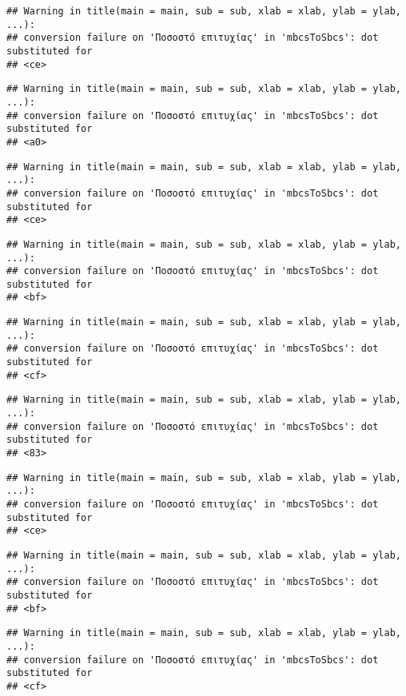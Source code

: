 \documentclass[
]{article}
\begin{document}
\begin{verbatim}
## Warning in title(main = main, sub = sub, xlab = xlab, ylab = ylab, ...):
## conversion failure on 'Ποσοστό επιτυχίας' in 'mbcsToSbcs': dot substituted for
## <ce>
\end{verbatim}

\begin{verbatim}
## Warning in title(main = main, sub = sub, xlab = xlab, ylab = ylab, ...):
## conversion failure on 'Ποσοστό επιτυχίας' in 'mbcsToSbcs': dot substituted for
## <a0>
\end{verbatim}

\begin{verbatim}
## Warning in title(main = main, sub = sub, xlab = xlab, ylab = ylab, ...):
## conversion failure on 'Ποσοστό επιτυχίας' in 'mbcsToSbcs': dot substituted for
## <ce>
\end{verbatim}

\begin{verbatim}
## Warning in title(main = main, sub = sub, xlab = xlab, ylab = ylab, ...):
## conversion failure on 'Ποσοστό επιτυχίας' in 'mbcsToSbcs': dot substituted for
## <bf>
\end{verbatim}

\begin{verbatim}
## Warning in title(main = main, sub = sub, xlab = xlab, ylab = ylab, ...):
## conversion failure on 'Ποσοστό επιτυχίας' in 'mbcsToSbcs': dot substituted for
## <cf>
\end{verbatim}

\begin{verbatim}
## Warning in title(main = main, sub = sub, xlab = xlab, ylab = ylab, ...):
## conversion failure on 'Ποσοστό επιτυχίας' in 'mbcsToSbcs': dot substituted for
## <83>
\end{verbatim}

\begin{verbatim}
## Warning in title(main = main, sub = sub, xlab = xlab, ylab = ylab, ...):
## conversion failure on 'Ποσοστό επιτυχίας' in 'mbcsToSbcs': dot substituted for
## <ce>
\end{verbatim}

\begin{verbatim}
## Warning in title(main = main, sub = sub, xlab = xlab, ylab = ylab, ...):
## conversion failure on 'Ποσοστό επιτυχίας' in 'mbcsToSbcs': dot substituted for
## <bf>
\end{verbatim}

\begin{verbatim}
## Warning in title(main = main, sub = sub, xlab = xlab, ylab = ylab, ...):
## conversion failure on 'Ποσοστό επιτυχίας' in 'mbcsToSbcs': dot substituted for
## <cf>
\end{verbatim}
\end{document}
